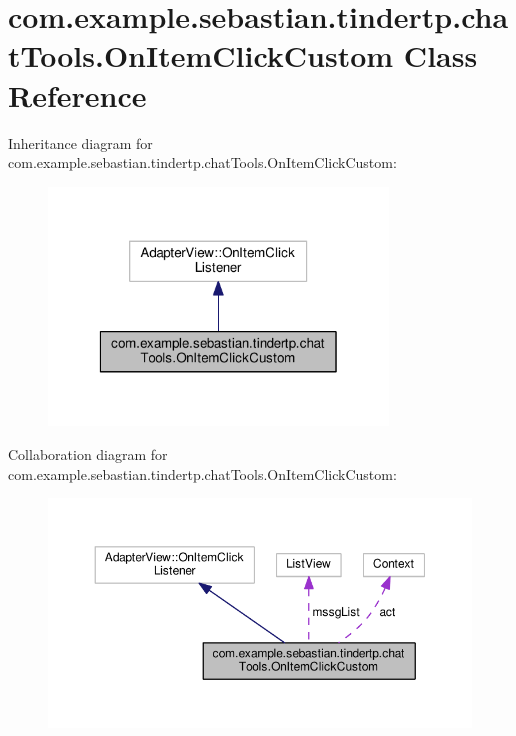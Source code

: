 \hypertarget{classcom_1_1example_1_1sebastian_1_1tindertp_1_1chatTools_1_1OnItemClickCustom}{}\section{com.\+example.\+sebastian.\+tindertp.\+chat\+Tools.\+On\+Item\+Click\+Custom Class Reference}
\label{classcom_1_1example_1_1sebastian_1_1tindertp_1_1chatTools_1_1OnItemClickCustom}


Inheritance diagram for com.\+example.\+sebastian.\+tindertp.\+chat\+Tools.\+On\+Item\+Click\+Custom\+:\nopagebreak
\begin{figure}[H]
\begin{center}
\leavevmode
\includegraphics[width=256pt]{classcom_1_1example_1_1sebastian_1_1tindertp_1_1chatTools_1_1OnItemClickCustom__inherit__graph}
\end{center}
\end{figure}


Collaboration diagram for com.\+example.\+sebastian.\+tindertp.\+chat\+Tools.\+On\+Item\+Click\+Custom\+:\nopagebreak
\begin{figure}[H]
\begin{center}
\leavevmode
\includegraphics[width=350pt]{classcom_1_1example_1_1sebastian_1_1tindertp_1_1chatTools_1_1OnItemClickCustom__coll__graph}
\end{center}
\end{figure}
